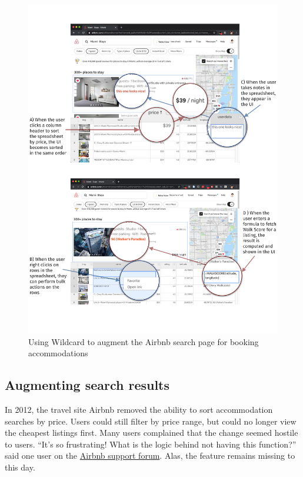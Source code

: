 \documentclass[sigplan,10pt,anonymous,review]{acmart}
\begin{document}
\begin{figure}
\hypertarget{fig:airbnb-demo}{%
\centering
\includegraphics{media/airbnb-demo-300dpi.png}
\caption{Using Wildcard to augment the Airbnb search page for booking
accommodations}\label{fig:airbnb-demo}
}
\end{figure}

\hypertarget{augmenting-search-results}{%
\subsection{Augmenting search results}\label{augmenting-search-results}}

In 2012, the travel site Airbnb removed the ability to sort
accommodation searches by price. Users could still filter by price
range, but could no longer view the cheapest listings first. Many users
complained that the change seemed hostile to users. ``It's so
frustrating! What is the logic behind not having this function?'' said
one user on the
\href{https://community.withairbnb.com/t5/Hosting/Sorting-listing-by-price/td-p/559404}{Airbnb
support forum}. Alas, the feature remains missing to this day.
\end{document}
